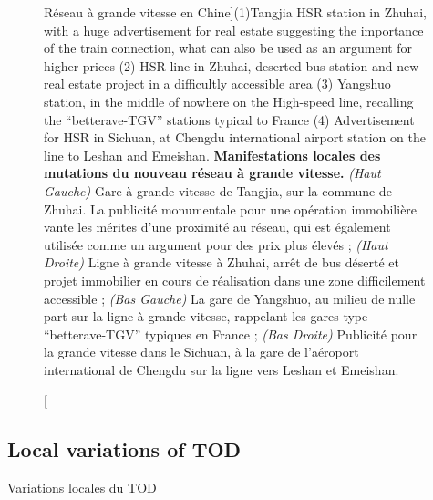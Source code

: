 \begin{figure}
	\caption[][Réseau à grande vitesse en Chine]{(1)Tangjia HSR station in Zhuhai, with a huge advertisement for real estate suggesting the importance of the train connection, what can also be used as an argument for higher prices  (2) HSR line in Zhuhai, deserted bus station and new real estate project in a difficultly accessible area  (3) Yangshuo station, in the middle of nowhere on the High-speed line, recalling the “betterave-TGV” stations typical to France (4) Advertisement for HSR in Sichuan, at Chengdu international airport station on the line to Leshan and Emeishan. \label{fig:qualitative:hsr}}{\textbf{Manifestations locales des mutations du nouveau réseau à grande vitesse.} \textit{(Haut Gauche)} Gare à grande vitesse de Tangjia, sur la commune de Zhuhai. La publicité monumentale pour une opération immobilière vante les mérites d'une proximité au réseau, qui est également utilisée comme un argument pour des prix plus élevés ; \textit{(Haut Droite)} Ligne à grande vitesse à Zhuhai, arrêt de bus déserté et projet immobilier en cours de réalisation dans une zone difficilement accessible ; \textit{(Bas Gauche)} La gare de Yangshuo, au milieu de nulle part sur la ligne à grande vitesse, rappelant les gares type ``betterave-TGV'' typiques en France ; \textit{(Bas Droite)} Publicité pour la grande vitesse dans le Sichuan, à la gare de l'aéroport international de Chengdu sur la ligne vers Leshan et Emeishan.\label{fig:qualitative:hsr}}
\end{figure}






\subsection{Local variations of TOD}{Variations locales du TOD}


